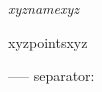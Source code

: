 \textit{xyznamexyz}
\begin{itemize}[leftmargin=1.5em,itemsep=2pt,topsep=3pt]
xyzpointsxyz
\end{itemize}
-----
separator: \vspace{6pt}
